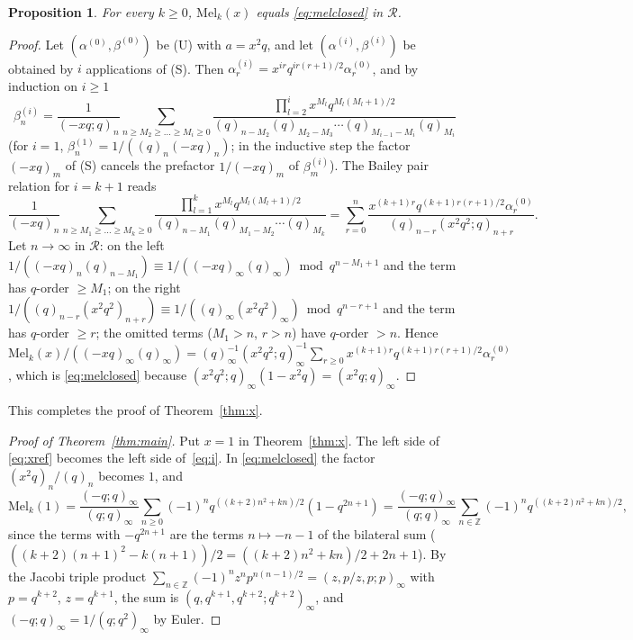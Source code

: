 \documentclass[11pt]{amsart}
\newtheorem{proposition}[theorem]{Proposition}
\theoremstyle{definition}
\numberwithin{equation}{section}
\newcommand{\Z}{\mathbb{Z}}
\newcommand{\R}{\mathcal{R}}
\newcommand{\Mel}{\mathrm{Mel}}
\begin{document}
\begin{proposition}\label{prop:bailey}
For every $k\ge0$, $\Mel_k(x)$ equals \eqref{eq:melclosed} in $\R$.
\end{proposition}
\begin{proof}
Let $(\alpha^{(0)},\beta^{(0)})$ be (U) with $a=x^2q$, and let $(\alpha^{(i)},\beta^{(i)})$ be obtained by
$i$ applications of (S). Then $\alpha^{(i)}_r=x^{ir}q^{ir(r+1)/2}\alpha^{(0)}_r$, and by induction on $i\ge1$
\[
\beta^{(i)}_n=\frac1{(-xq;q)_n}\sum_{n\ge M_2\ge\dots\ge M_i\ge0}
\frac{\prod_{l=2}^{i}x^{M_l}q^{M_l(M_l+1)/2}}{(q)_{n-M_2}(q)_{M_2-M_3}\cdots(q)_{M_{i-1}-M_i}(q)_{M_i}}
\]
(for $i=1$, $\beta^{(1)}_n=1/((q)_n(-xq)_n)$; in the inductive step the factor $(-xq)_m$ of (S) cancels the
prefactor $1/(-xq)_m$ of $\beta^{(i)}_m$). The Bailey pair relation for $i=k+1$ reads
\[
\frac1{(-xq)_n}\sum_{n\ge M_1\ge\dots\ge M_k\ge0}\frac{\prod_{l=1}^kx^{M_l}q^{M_l(M_l+1)/2}}{(q)_{n-M_1}(q)_{M_1-M_2}\cdots(q)_{M_k}}
=\sum_{r=0}^n\frac{x^{(k+1)r}q^{(k+1)r(r+1)/2}\alpha^{(0)}_r}{(q)_{n-r}(x^2q^2;q)_{n+r}} .
\]
Let $n\to\infty$ in $\R$: on the left $1/((-xq)_n(q)_{n-M_1})\equiv1/((-xq)_\infty(q)_\infty)\bmod
q^{n-M_1+1}$ and the term has $q$-order $\ge M_1$; on the right
$1/((q)_{n-r}(x^2q^2)_{n+r})\equiv1/((q)_\infty(x^2q^2)_\infty)\bmod q^{n-r+1}$ and the term has
$q$-order $\ge r$; the omitted terms ($M_1>n$, $r>n$) have $q$-order $>n$. Hence
$\Mel_k(x)/((-xq)_\infty(q)_\infty)=(q)_\infty^{-1}(x^2q^2;q)_\infty^{-1}\sum_{r\ge0}x^{(k+1)r}q^{(k+1)r(r+1)/2}\alpha^{(0)}_r$,
which is \eqref{eq:melclosed} because $(x^2q^2;q)_\infty(1-x^2q)=(x^2q;q)_\infty$.
\end{proof}

This completes the proof of Theorem~\ref{thm:x}.

\begin{proof}[Proof of Theorem~\ref{thm:main}]
Put $x=1$ in Theorem~\ref{thm:x}. The left side of \eqref{eq:xref} becomes the left side of~\eqref{eq:i}.
In \eqref{eq:melclosed} the factor $(x^2q)_n/(q)_n$ becomes $1$, and
\[
\Mel_k(1)=\frac{(-q;q)_\infty}{(q;q)_\infty}\sum_{n\ge0}(-1)^nq^{((k+2)n^2+kn)/2}(1-q^{2n+1})
=\frac{(-q;q)_\infty}{(q;q)_\infty}\sum_{n\in\Z}(-1)^nq^{((k+2)n^2+kn)/2},
\]
since the terms with $-q^{2n+1}$ are the terms $n\mapsto-n-1$ of the bilateral sum
($((k+2)(n+1)^2-k(n+1))/2=((k+2)n^2+kn)/2+2n+1$). By the Jacobi triple product
$\sum_{n\in\Z}(-1)^nz^np^{n(n-1)/2}=(z,p/z,p;p)_\infty$ with $p=q^{k+2}$, $z=q^{k+1}$, the sum is
$(q,q^{k+1},q^{k+2};q^{k+2})_\infty$, and $(-q;q)_\infty=1/(q;q^2)_\infty$ by Euler.
\end{proof}
\end{document}
